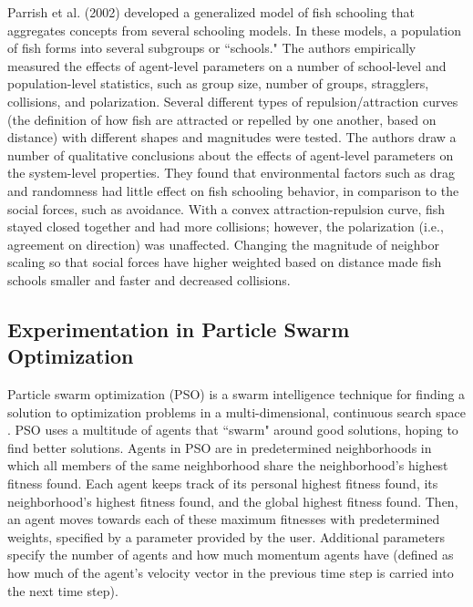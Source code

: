 Parrish et al. (2002)\nocite{parrish2002sof} developed a generalized model of fish schooling that aggregates concepts from several schooling models.
In these models, a population of fish forms into several subgroups or ``schools."
The authors empirically measured the effects of agent-level parameters on a number of school-level and population-level statistics, such as group size, number of groups, stragglers, collisions, and polarization.
Several different types of repulsion/attraction curves (the definition of how fish are attracted or repelled by one another, based on distance) with different shapes and magnitudes were tested.
The authors draw a number of qualitative conclusions about the effects of agent-level parameters on the system-level properties.
They found that environmental factors such as drag and randomness had little effect on fish schooling behavior, in comparison to the social forces, such as avoidance.
With a convex attraction-repulsion curve, fish stayed closed together and had more collisions; however, the polarization (i.e., agreement on direction) was unaffected.
Changing the magnitude of neighbor scaling so that social forces have higher weighted based on distance made fish schools smaller and faster and decreased collisions.


\subsection{Experimentation in Particle Swarm Optimization}

Particle swarm optimization (PSO) is a swarm intelligence technique for finding a solution to optimization problems in a multi-dimensional, continuous search space \cite{kennedy1995pso}.
PSO uses a multitude of agents that ``swarm" around good solutions, hoping to find better solutions.
Agents in PSO are in predetermined neighborhoods in which all members of the same neighborhood share the neighborhood's highest fitness found.
Each agent keeps track of its personal highest fitness found, its neighborhood's highest fitness found, and the global highest fitness found.
Then, an agent moves towards each of these maximum fitnesses with predetermined weights, specified by a parameter provided by the user.
Additional parameters specify the number of agents and how much momentum agents have (defined as how much of the agent's velocity vector in the previous time step is carried into the next time step).

